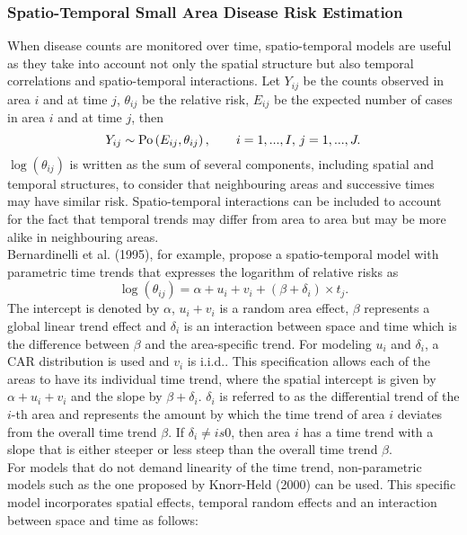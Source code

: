 \documentclass[12pt]{book}
\begin{document}
\subsubsection{Spatio-Temporal Small Area Disease Risk Estimation}
When disease counts are monitored over time, spatio-temporal models are useful as they take into account not only the spatial structure but also temporal correlations and spatio-temporal interactions. Let $Y_{ij}$ be the counts observed in area $i$ and at time $j$, $\theta_{ij}$ be the relative risk, $E_{ij}$ be the expected number of cases in area $i$ and at time $j$, then
\begin{equation}
    Y_{ij}\sim\hbox{Po}\left(E_{ij}, \theta_{ij}\right), \hspace{20pt} i=1,...,I,\,j=1,...,J.
\end{equation}
$\log\left(\theta_{ij}\right)$ is written as the sum of several components, including spatial and temporal structures, to consider that neighbouring areas and successive times may have similar risk. Spatio-temporal interactions can be included to account for the fact that temporal trends may differ from area to area but may be more alike in neighbouring areas. \\
Bernardinelli et al. (1995), for example, propose a spatio-temporal model with parametric time trends that expresses the logarithm of relative risks as
\begin{equation}
    \log\left(\theta_{ij}\right)=\alpha+u_i+v_i+ \left(\beta+\delta_i\right)\times t_j.
\end{equation}
The intercept is denoted by $\alpha$, $u_i+v_i$ is a random area effect, $\beta$ represents a global linear trend effect and $\delta_i$ is an interaction between space and time which is the difference between $\beta$ and the area-specific trend. For modeling $u_i$ and $\delta_i$, a CAR distribution is used and $v_i$ is i.i.d.. This specification allows each of the areas to have its individual time trend, where the spatial intercept is given by $\alpha+u_i+v_i$ and the slope by $\beta+\delta_i$. $\delta_i$ is referred to as the differential trend of the $i$-th area and represents the amount by which the time trend of area $i$ deviates from the overall time trend $\beta$. If $\delta_i\neq is 0$, then area $i$ has a time trend with a slope that is either steeper or less steep than the overall time trend $\beta$. \\
For models that do not demand linearity of the time trend, non-parametric models such as the one proposed by Knorr-Held (2000) can be used. This specific model incorporates spatial effects, temporal random effects and an interaction between space and time as follows:
\end{document}
